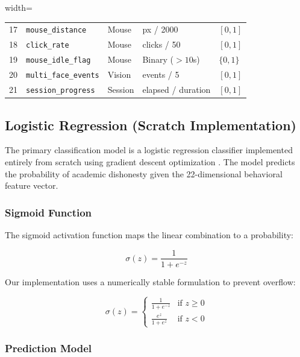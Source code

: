 \documentclass{article}
\begin{document}
\begin{table}[H]
\begin{adjustbox}{width=\textwidth}
\begin{tabular}{c l l l l}
17 & \texttt{mouse\_distance} & Mouse & px / 2000 & $[0, 1]$ \\
18 & \texttt{click\_rate} & Mouse & clicks / 50 & $[0, 1]$ \\
19 & \texttt{mouse\_idle\_flag} & Mouse & Binary ($>10$s) & $\{0, 1\}$ \\
20 & \texttt{multi\_face\_events} & Vision & events / 5 & $[0, 1]$ \\
21 & \texttt{session\_progress} & Session & elapsed / duration & $[0, 1]$ \\
\bottomrule
\end{tabular}
\end{adjustbox}
\end{table}

\subsection{Logistic Regression (Scratch Implementation)}

The primary classification model is a logistic regression classifier implemented entirely from scratch using gradient descent optimization \cite{bishop_ml}. The model predicts the probability of academic dishonesty given the 22-dimensional behavioral feature vector.

\subsubsection{Sigmoid Function}

The sigmoid activation function maps the linear combination to a probability:

\begin{equation}
    \sigma(z) = \frac{1}{1 + e^{-z}}
    \label{eq:sigmoid}
\end{equation}

Our implementation uses a numerically stable formulation to prevent overflow:

\begin{equation}
    \sigma(z) = \begin{cases}
        \frac{1}{1 + e^{-z}} & \text{if } z \geq 0 \\[6pt]
        \frac{e^z}{1 + e^z} & \text{if } z < 0
    \end{cases}
    \label{eq:stable_sigmoid}
\end{equation}

\subsubsection{Prediction Model}
\end{document}

